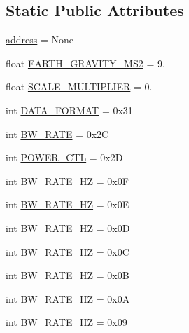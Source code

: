 \subsection*{Static Public Attributes}
\begin{DoxyCompactItemize}
\item 
\hyperlink{classconcretesensor_1_1adxl345_1_1ADXL345_ac4b65bfea69bd1281f6e2dee4ac26d7c}{address} = None
\item 
float \hyperlink{classconcretesensor_1_1adxl345_1_1ADXL345_a7b736ebf7e6e767dc3c41e7d9e162ef9}{E\+A\+R\+T\+H\+\_\+\+G\+R\+A\+V\+I\+T\+Y\+\_\+\+M\+S2} = 9.
\item 
float \hyperlink{classconcretesensor_1_1adxl345_1_1ADXL345_a05a15fe5aad46a27d00c11655dec56e9}{S\+C\+A\+L\+E\+\_\+\+M\+U\+L\+T\+I\+P\+L\+I\+E\+R} = 0.
\item 
int \hyperlink{classconcretesensor_1_1adxl345_1_1ADXL345_a229019dbd9ceb0a7d2e5cf891ffeb389}{D\+A\+T\+A\+\_\+\+F\+O\+R\+M\+A\+T} = 0x31
\item 
int \hyperlink{classconcretesensor_1_1adxl345_1_1ADXL345_a45cf9961b618f624031023bd29a70409}{B\+W\+\_\+\+R\+A\+T\+E} = 0x2\+C
\item 
int \hyperlink{classconcretesensor_1_1adxl345_1_1ADXL345_a04f75993dca0a0bc1900fe47bd133e96}{P\+O\+W\+E\+R\+\_\+\+C\+T\+L} = 0x2\+D
\item 
int \hyperlink{classconcretesensor_1_1adxl345_1_1ADXL345_a6837bcc8fa8e7a073dc19ff96cf2a4e1}{B\+W\+\_\+\+R\+A\+T\+E\+\_\+H\+Z} = 0x0\+F
\item 
int \hyperlink{classconcretesensor_1_1adxl345_1_1ADXL345_a873a1807c470b0e7b877b07d8509d6be}{B\+W\+\_\+\+R\+A\+T\+E\+\_\+H\+Z} = 0x0\+E
\item 
int \hyperlink{classconcretesensor_1_1adxl345_1_1ADXL345_aae824b4a226907cb2b0279b6469e954b}{B\+W\+\_\+\+R\+A\+T\+E\+\_\+H\+Z} = 0x0\+D
\item 
int \hyperlink{classconcretesensor_1_1adxl345_1_1ADXL345_a5b08ef48a3fa23d78d9e25ce01b91082}{B\+W\+\_\+\+R\+A\+T\+E\+\_\+H\+Z} = 0x0\+C
\item 
int \hyperlink{classconcretesensor_1_1adxl345_1_1ADXL345_ada28a95b6da5886e87d724dda9a9c0f2}{B\+W\+\_\+\+R\+A\+T\+E\+\_\+H\+Z} = 0x0\+B
\item 
int \hyperlink{classconcretesensor_1_1adxl345_1_1ADXL345_a3380c0759b4261cda9882f4fa243b8ba}{B\+W\+\_\+\+R\+A\+T\+E\+\_\+H\+Z} = 0x0\+A
\item 
int \hyperlink{classconcretesensor_1_1adxl345_1_1ADXL345_a806cb18f8b55f6c22b07ff1ec9ce28e5}{B\+W\+\_\+\+R\+A\+T\+E\+\_\+H\+Z} = 0x09

\end{DoxyCompactItemize}
